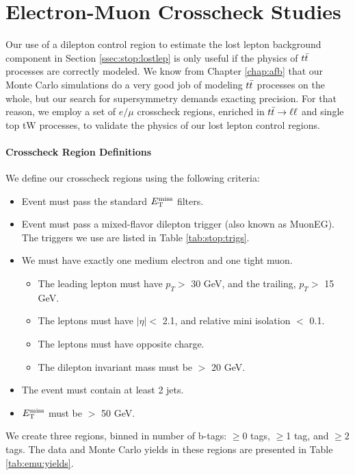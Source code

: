 \chapter{Electron-Muon Crosscheck Studies}
\label{apx:stop:emustudies}

Our use of a dilepton control region to estimate the lost lepton
background component in Section \ref{ssec:stop:lostlep} is only useful
if the physics of $t\bar{t}$
processes are correctly modeled. We know from Chapter \ref{chap:afb}
that our Monte Carlo simulations do a very good job of modeling
$t\bar{t}$ processes on the whole, but our search for supersymmetry
demands exacting precision. For that reason, we employ a set of $e/\mu$
crosscheck regions, enriched in $t\bar{t} \rightarrow \ell\ell$ and single top tW processes,
to validate the physics of our lost lepton control regions.

\subsubsection{Crosscheck Region Definitions}
\label{sssec:emu:regdefs}

We define our crosscheck regions using the following criteria:
\begin{itemize}
\item Event must pass the standard $E_\text{T}^\text{miss}$ filters.
\item Event must pass a mixed-flavor dilepton trigger (also known as
  MuonEG). The triggers we use are listed in Table
  \ref{tab:stop:trigs}.
\item We must have exactly one medium electron and one tight muon.
  \begin{itemize}
  \item The leading lepton must have $p_T >$ 30 GeV, and the
    trailing, $p_T >$ 15 GeV.
  \item The leptons must have $|\eta| <$ 2.1, and relative mini
    isolation $<$ 0.1.
  \item The leptons must have opposite charge.
  \item The dilepton invariant mass must be $>$ 20 GeV.
  \end{itemize}
\item The event must contain at least 2 jets.
\item $E_\text{T}^\text{miss}$ must be $>$ 50 GeV.
\end{itemize}
We create three regions, binned in number of b-tags: $\geq$0 tags, $\geq$1 tag,
and $\geq2$ tags. The data and Monte Carlo yields in these regions are
presented in Table \ref{tab:emu:yields}.

